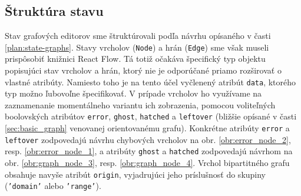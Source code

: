 \subsection{Štruktúra stavu}

Stav grafových editorov sme štruktúrovali podľa návrhu opísaného v časti \ref{plan:state-graphs}. Stavy vrcholov (\texttt{Node}) a hrán (\texttt{Edge}) sme však museli prispôsobiť knižnici React Flow. Tá totiž očakáva špecifický typ objektu popisujúci stav vrcholov a hrán, ktorý nie je odporúčané priamo rozširovať o vlastné atribúty. Namiesto toho je na tento účel vyčlenený atribút \texttt{data}, ktorého typ možno ľubovoľne špecifikovať. V prípade vrcholov ho využívame na zaznamenanie momentálneho variantu ich zobrazenia, pomocou voliteľných boolovských atribútov \texttt{error}, \texttt{ghost}, \texttt{hatched} a \texttt{leftover} (bližšie opísané v časti \ref{sec:basic_graph} venovanej orientovanému grafu). Konkrétne atribúty \texttt{error} a \texttt{leftover} zodpovedajú návrhu chybových vrcholov na obr. \ref{obr:error_node_2}, resp. \ref{obr:error_node_1}, a atribúty \texttt{ghost} a \texttt{hatched} zodpovedajú návrhom na obr. \ref{obr:graph_node_3}, resp. \ref{obr:graph_node_4}. Vrchol bipartitného grafu obsahuje navyše atribút \texttt{origin}, vyjadrujúci jeho príslušnosť do skupiny (\texttt{'domain'} alebo \texttt{'range'}).


